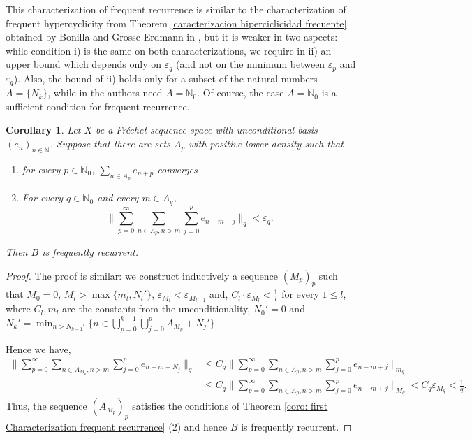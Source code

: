 \documentclass[11pt]{amsart}
\newtheorem{corollary}[theorem]{Corollary}
\begin{document}
This characterization of frequent recurrence is similar to the characterization of frequent hypercyclicity from Theorem \ref{caracterizacion hiperciclicidad frecuente} obtained by Bonilla and Grosse-Erdmann in \cite{BonGro18}, but it is weaker in two aspects: while condition i) is the same on both characterizations, we require in ii) an upper bound which depends only on $\varepsilon_q$ (and not on the minimum between  $\varepsilon_p$ and $\varepsilon_q$). Also, the bound of ii) holds only for a subset of the natural numbers $A=\{N_k\}$, while in \cite{BonGro18} the authors need $A=\mathbb N_0$. Of course, the case $A=\mathbb N_0$ is a sufficient condition for frequent recurrence.
\begin{corollary}\label{Corolario zN}
Let $X$ be a Fr\'echet sequence space with unconditional basis $(e_n)_{n\in \mathbb N}$. Suppose that there are sets $A_p$ with positive lower density such that
\begin{enumerate}
\item [i)]for every $p\in\mathbb N_0$, $\sum_{n\in A_p}e_{n+p}$ converges 
    \item [ii)]
    For every $q\in\mathbb N_0$ and every  $m\in A_q$,
    $$\|\sum_{p=0}^\infty \sum_{n\in A_p, n>m} \sum_{j=0}^p e_{n-m+j}\|_q<\varepsilon_q.$$
    \end{enumerate}Then $B$ is frequently recurrent.
\end{corollary}
\begin{proof}
The proof is similar: we construct inductively a sequence $(M_p)_p$ such that $M_0=0$,
  $M_{l}>\max\{m_{l},N_l'\}$,
 $\varepsilon_{M_l}<\varepsilon_{M_{l-1}}$ and,
  $C_l\cdot\varepsilon_{M_l}<\frac{1}{l}$ for every $1\leq l$,
where $C_l,m_l$ are the constants from the unconditionality, $N_0'=0$ and $N_k' =\min_{n>N_{k-1}'} \{n\in\bigcup_{p=0}^{k-1}\bigcup_{j=0}^p A_{M_p}+N_j'\}$.

Hence we have,
\begin{align*}
\|\sum_{p=0}^\infty \sum_{n\in A_{M_p}, n>m}\sum_{j=0}^p e_{n-m+N_j}\|_q &\le C_q\|\sum_{p=0}^\infty \sum_{n\in A_{p}, n>m}\sum_{j=0}^p e_{n-m+j}\|_{m_q}\\
&\le C_q\|\sum_{p=0}^\infty \sum_{n\in A_{p}, n>m}\sum_{j=0}^p e_{n-m+j}\|_{M_q}<C_q\varepsilon_{M_q}<\frac1{q}.   
\end{align*}
Thus, the sequence $(A_{M_p})_p$ satisfies the conditions of Theorem \ref{coro: first Characterization frequent recurrence} (2) and hence $B$ is frequently recurrent.
\end{proof}
\end{document}

